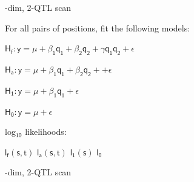 \documentclass[12pt]{article}
\newcommand{\headsize}{\fontsize{35}{35} \selectfont}
\newcommand{\smallsize}{\fontsize{25}{30} \selectfont}
\begin{document}
\headsize \color{myyellow}
\hfill \begin{minipage}{5.75in}
-dim, 2-QTL scan
\end{minipage}

\vspace{2cm}

\color{mywhite} \smallsize

\hfill \begin{minipage}[t]{10in}
For all pairs of positions, fit the following models:

\vspace{10mm}

\hfill
\begin{minipage}{9in}
{\color{myblue}
$\mathsf{\text{H}_f: y = \mu + \beta_1 q_1 + \beta_2 q_2 +
      \gamma q_1 q_2 + \epsilon}$

\vspace{5mm}

$\mathsf{\text{H}_a: y = \mu + \beta_1 q_1 + \beta_2 q_2 +
      + \epsilon}$

\vspace{5mm}

$\mathsf{\text{H}_1: y = \mu + \beta_1 q_1 + \epsilon}$

\vspace{5mm}

$\mathsf{\text{H}_0: y = \mu + \epsilon}$

}
\end{minipage}

\vspace{20mm}

log$_{\mathsf{10}}$ likelihoods:

\vspace{5mm}

\hfill
\begin{minipage}{9in}
{\color{myblue}

$\mathsf{l_f(s,t)}$ \hspace{2cm}
$\mathsf{l_a(s,t)}$ \hspace{2cm}
$\mathsf{l_1(s)}$ \hspace{2cm}
$\mathsf{l_0}$ \hspace{2cm}
}
\end{minipage}


\end{minipage}


\newpage

\headsize \color{myyellow}
\hfill \begin{minipage}{5.75in}
-dim, 2-QTL scan
\end{minipage}
\end{document}
